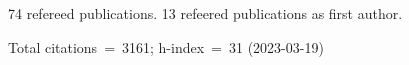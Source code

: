 74 refereed publications. 13 refeered publications as first author.

Total citations~=~3161; h-index~=~31 (2023-03-19)